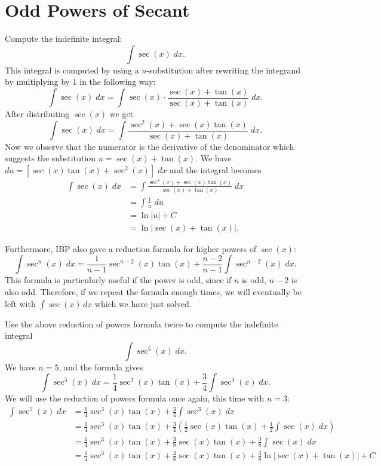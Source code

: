 \documentclass{ximera}
\begin{document}
\section{Odd Powers of Secant}
\begin{example}
Compute the indefinite integral:
\[
\int \sec(x) \; dx.
\]
This integral is computed by using a $u$-substitution after rewriting the integrand
by multiplying by 1 in the following way:
\[
\int \sec(x) \; dx = \int \sec(x) \cdot \frac{\sec(x) + \tan(x)}{\sec(x) + \tan(x)} \; dx.
\]
After distributing $\sec(x)$ we get
\[
\int \sec(x) \; dx = \int \frac{\sec^2(x) + \sec(x)\tan(x)}{\sec(x) + \tan(x)} \; dx.
\]
Now we observe that the numerator is the derivative of the denominator which suggests the substitution
$u = \sec(x) + \tan(x)$. We have $du = [ \sec(x)\tan(x) + \sec^2(x)] \; dx$ and the integral becomes
\begin{align*}
\int \sec(x) \; dx &= \int \frac{\sec^2(x) + \sec(x)\tan(x)}{\sec(x) + \tan(x)} \; dx\\
&= \int \frac{1}{u} \; du\\
&= \ln|u| + C\\
&= \ln|\sec(x) + \tan(x)|.
\end{align*}

\end{example}

Furthermore, IBP also gave a reduction formula for higher powers of $\sec(x)$:
\[
\int \sec^n(x) \; dx =  \frac{1}{n-1}\sec^{n-2}(x)\tan(x) + \frac{n-2}{n-1}\int \sec^{n-2}(x) \; dx. 
\]
This formula is particularly useful if
the power is odd, since if $n$ is odd, $n-2$ is also odd.  Therefore, if we repeat the formula enough times, 
we will eventually be left with $\int \sec(x) \, dx$
which we have just solved.

\begin{example}
Use the above reduction of powers formula twice to compute the indefinite integral
\[
\int \sec^5(x) \; dx.
\]
We have $n =5$, and the formula gives
\[
\int \sec^5(x) \; dx = \frac14 \sec^3(x)\tan(x) + \frac34 \int \sec^3(x) \; dx.
\]
We will use the reduction of powers formula once again, this time with $n=3$:
\begin{align*}
\int \sec^5(x) \; dx &= \frac14 \sec^3(x)\tan(x) + \frac34 \int \sec^3(x) \; dx\\
&= \frac14 \sec^3(x)\tan(x) + \frac34\left(\frac12\sec(x)\tan(x) + \frac12\int \sec(x) \; dx\right)\\
&=\frac14 \sec^3(x)\tan(x) + \frac38\sec(x)\tan(x) + \frac38 \int \sec(x) \; dx \\
&=\frac14 \sec^3(x)\tan(x) + \frac38\sec(x)\tan(x) + \frac38\ln|\sec(x) + \tan(x)| + C
\end{align*}
\end{example}
\end{document}
